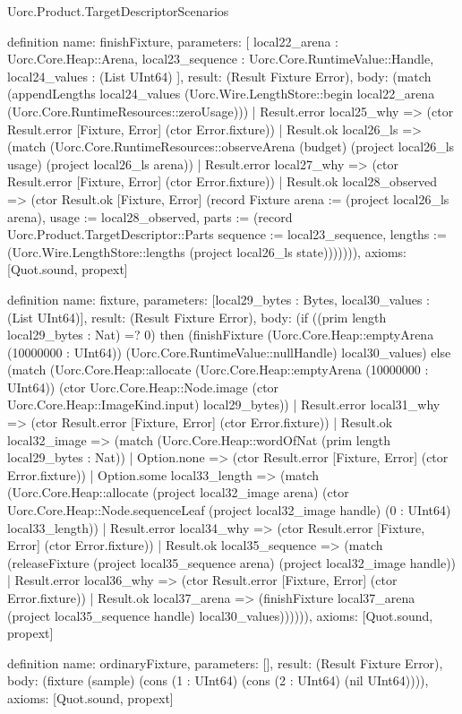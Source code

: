 \begin{lexlean}{Uorc.Product.TargetDescriptorScenarios}
\begin{semanticmodule}
definition{
  name: finishFixture,
  parameters: [
    local22_arena : Uorc.Core.Heap::Arena,
    local23_sequence : Uorc.Core.RuntimeValue::Handle,
    local24_values : (List UInt64)
  ],
  result: (Result Fixture Error),
  body: (match (appendLengths local24_values (Uorc.Wire.LengthStore::begin local22_arena (Uorc.Core.RuntimeResources::zeroUsage)))
    | Result.error local25_why => (ctor Result.error [Fixture, Error] (ctor Error.fixture))
    | Result.ok local26_ls => (match (Uorc.Core.RuntimeResources::observeArena (budget) (project local26_ls usage) (project local26_ls arena))
      | Result.error local27_why => (ctor Result.error [Fixture, Error] (ctor Error.fixture))
      | Result.ok local28_observed => (ctor Result.ok [Fixture, Error] (record Fixture {arena := (project local26_ls arena), usage := local28_observed, parts := (record Uorc.Product.TargetDescriptor::Parts {sequence := local23_sequence, lengths := (Uorc.Wire.LengthStore::lengths (project local26_ls state))})})))),
  axioms: [Quot.sound, propext]
}

definition{
  name: fixture,
  parameters: [local29_bytes : Bytes, local30_values : (List UInt64)],
  result: (Result Fixture Error),
  body: (if ((prim length local29_bytes : Nat) =? 0) then (finishFixture (Uorc.Core.Heap::emptyArena (10000000 : UInt64)) (Uorc.Core.RuntimeValue::nullHandle) local30_values) else (match (Uorc.Core.Heap::allocate (Uorc.Core.Heap::emptyArena (10000000 : UInt64)) (ctor Uorc.Core.Heap::Node.image (ctor Uorc.Core.Heap::ImageKind.input) local29_bytes))
    | Result.error local31_why => (ctor Result.error [Fixture, Error] (ctor Error.fixture))
    | Result.ok local32_image => (match (Uorc.Core.Heap::wordOfNat (prim length local29_bytes : Nat))
      | Option.none => (ctor Result.error [Fixture, Error] (ctor Error.fixture))
      | Option.some local33_length => (match (Uorc.Core.Heap::allocate (project local32_image arena) (ctor Uorc.Core.Heap::Node.sequenceLeaf (project local32_image handle) (0 : UInt64) local33_length))
        | Result.error local34_why => (ctor Result.error [Fixture, Error] (ctor Error.fixture))
        | Result.ok local35_sequence => (match (releaseFixture (project local35_sequence arena) (project local32_image handle))
          | Result.error local36_why => (ctor Result.error [Fixture, Error] (ctor Error.fixture))
          | Result.ok local37_arena => (finishFixture local37_arena (project local35_sequence handle) local30_values)))))),
  axioms: [Quot.sound, propext]
}

definition{
  name: ordinaryFixture,
  parameters: [],
  result: (Result Fixture Error),
  body: (fixture (sample) (cons (1 : UInt64) (cons (2 : UInt64) (nil UInt64)))),
  axioms: [Quot.sound, propext]
}


\end{semanticmodule}
\end{lexlean}
